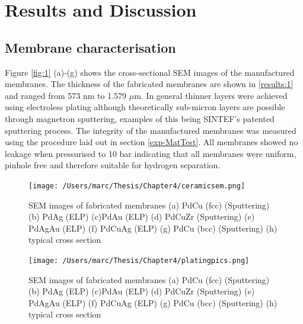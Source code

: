 \section{Results and Discussion}
\subsection{Membrane characterisation}

Figure \ref{fig:1} (a)-(g) shows the cross-sectional SEM images of the manufactured membranes.  The thickness of the fabricated membranes are shown in \ref{results:1} and ranged from 573 nm to 1.579 $\mu$m. In general thinner layers were achieved using electroless plating although theoretically sub-micron layers are possible through magnetron sputtering, examples of this being SINTEF’s patented sputtering process.\cite{Peters2011} The integrity of the manufactured membranes was measured using the procedure laid out in section \ref{exp-MatTest}. All membranes showed no leakage when pressurised to 10 bar indicating that all membranes were uniform, pinhole free and therefore suitable for hydrogen separation. \cite{GouveiaGil2015}

\begin{figure}
    \centering
    \texttt{[image: /Users/marc/Thesis/Chapter4/ceramicsem.png]}
    \caption{SEM images of fabricated membranes (a) PdCu (fcc) (Sputtering) (b) PdAg (ELP) (c)PdAu (ELP) (d) PdCuZr (Sputtering) (e) PdAgAu (ELP) (f) PdCuAg (ELP) (g) PdCu (bcc) (Sputtering) (h) typical cross section}
    \label{ceramicsem}
\end{figure}

\begin{figure}
    \centering
    \texttt{[image: /Users/marc/Thesis/Chapter4/platingpics.png]}
    \caption{SEM images of fabricated membranes (a) PdCu (fcc) (Sputtering) (b) PdAg (ELP) (c)PdAu (ELP) (d) PdCuZr (Sputtering) (e) PdAgAu (ELP) (f) PdCuAg (ELP) (g) PdCu (bcc) (Sputtering) (h) typical cross section}
    \label{platingpics}
\end{figure}

